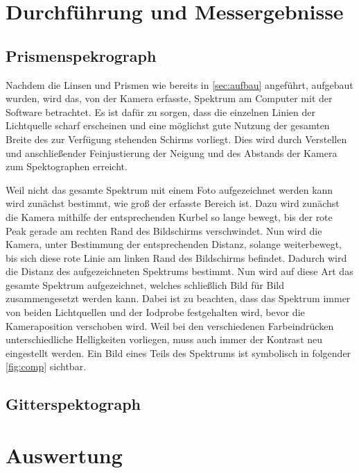 \documentclass[12pt,english,ngerman]{scrartcl}
\begin{document}
\section{Durchführung und Messergebnisse}\label{sec:durchfuhrung}

\subsection{Prismenspekrograph}

Nachdem die Linsen und Prismen wie bereits in \autoref{sec:aufbau} angeführt, aufgebaut wurden,
wird das, von der Kamera erfasste, Spektrum am Computer mit der Software
betrachtet. Es ist dafür zu sorgen, dass die einzelnen Linien der Lichtquelle scharf erscheinen und
eine möglichst gute Nutzung der gesamten Breite des zur Verfügung stehenden Schirms vorliegt. Dies wird durch
Verstellen und anschließender Feinjustierung der Neigung und des Abstands der Kamera zum Spektographen 
erreicht.

Weil nicht das gesamte Spektrum mit einem Foto aufgezeichnet werden kann wird zunächst bestimmt, wie groß der 
erfasste Bereich ist. Dazu wird zunächst die Kamera mithilfe der entsprechenden Kurbel so lange bewegt, bis der
rote Peak gerade am rechten Rand des Bildschirms verschwindet. Nun wird die Kamera, unter Bestimmung der entsprechenden 
Distanz, solange weiterbewegt, bis sich diese rote Linie am linken Rand des Bildschirms befindet. Dadurch wird die 
Distanz des aufgezeichneten Spektrums bestimmt. Nun wird auf diese Art das gesamte Spektrum aufgezeichnet, welches
schließlich Bild für Bild zusammengesetzt werden kann. Dabei ist zu beachten, dass das Spektrum immer von beiden 
Lichtquellen und der Iodprobe festgehalten wird, bevor die Kameraposition verschoben wird. Weil bei den verschiedenen 
Farbeindrücken unterschiedliche Helligkeiten vorliegen, muss auch immer der Kontrast neu eingestellt werden.
Ein Bild eines Teils des Spektrums ist symbolisch in folgender \autoref{fig:comp} sichtbar.





\subsection{Gitterspektograph}


\section{Auswertung}\label{sec:auswertung}
\end{document}
